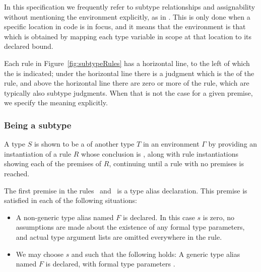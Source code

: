 \documentclass[makeidx]{article}
\begin{document}
{\LMHash{}%
In this specification we frequently refer to
subtype relationships and assignability
without mentioning the environment explicitly,
as in .
This is only done when a specific location in code is in focus,
and it means that the environment is that which is obtained
by mapping each type variable in scope at that location
to its declared bound.

\LMHash{}%
Each rule in Figure~\ref{fig:subtypeRules} has a horizontal line,
to the left of which the  is indicated;
under the horizontal line there is a judgment which is the
of the rule,
and above the horizontal line there are zero or more
of the rule,
which are typically also subtype judgments.
When that is not the case for a given premise,
we specify the meaning explicitly.



\subsubsection{Being a subtype}

\LMHash{}%
A type $S$ is shown to be a  of another type $T$
in an environment $\Gamma$ by providing
an instantiation of a rule $R$ whose conclusion is
,
along with rule instantiations showing
each of the premises of $R$,
continuing until a rule with no premises is reached.


\LMHash{}%
The first premise in the
rules~\SrnLeftTypeAlias{} and~\SrnRightTypeAlias{}
is a type alias declaration.
This premise is satisfied in each of the following situations:

\begin{itemize}
\item A non-generic type alias named $F$ is declared.
  In this case $s$ is zero,
  no assumptions are made about the existence
  of any formal type parameters,
  and actual type argument lists are omitted everywhere in the rule.
\item We may choose $s$ and  such that the following holds:
  A generic type alias named $F$ is declared,
  with formal type parameters .
\end{itemize}

}
\end{document}
